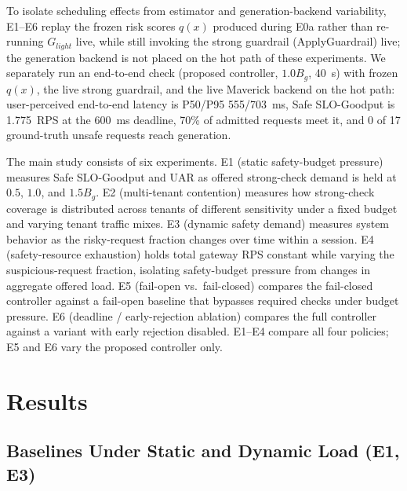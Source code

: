 \documentclass[conference]{IEEEtran}
\newcommand{\Glight}{G_{\mathit{light}}}
\newcommand{\Bg}{B_g}
\begin{document}
To isolate scheduling effects from estimator and generation-backend variability, E1--E6 replay the frozen risk scores $q(x)$ produced during E0a rather than re-running $\Glight$ live, while still invoking the strong guardrail (ApplyGuardrail) live; the generation backend is not placed on the hot path of these experiments. We separately run an end-to-end check (proposed controller, $1.0\Bg$, 40~s) with frozen $q(x)$, the live strong guardrail, and the live Maverick backend on the hot path: user-perceived end-to-end latency is P50/P95 555/703~ms, Safe SLO-Goodput is 1.775~RPS at the 600~ms deadline, 70\% of admitted requests meet it, and 0 of 17 ground-truth unsafe requests reach generation.

The main study consists of six experiments. E1 (static safety-budget pressure) measures Safe SLO-Goodput and UAR as offered strong-check demand is held at $0.5$, $1.0$, and $1.5\Bg$. E2 (multi-tenant contention) measures how strong-check coverage is distributed across tenants of different sensitivity under a fixed budget and varying tenant traffic mixes. E3 (dynamic safety demand) measures system behavior as the risky-request fraction changes over time within a session. E4 (safety-resource exhaustion) holds total gateway RPS constant while varying the suspicious-request fraction, isolating safety-budget pressure from changes in aggregate offered load. E5 (fail-open vs.\ fail-closed) compares the fail-closed controller against a fail-open baseline that bypasses required checks under budget pressure. E6 (deadline / early-rejection ablation) compares the full controller against a variant with early rejection disabled. E1--E4 compare all four policies; E5 and E6 vary the proposed controller only.

\section{Results}

\subsection{Baselines Under Static and Dynamic Load (E1, E3)}
\end{document}
